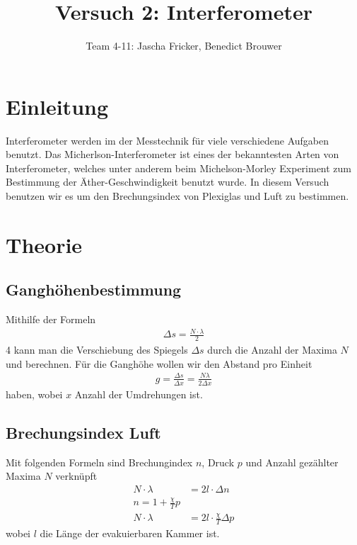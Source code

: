 \documentclass[11pt, a4paper]{article}
\title{Versuch 2: Interferometer}
\author{Team 4-11: Jascha Fricker, Benedict Brouwer}
\begin{document}
    \maketitle

    \tableofcontents

    \newpage

    \section{Einleitung}

    Interferometer werden im der Messtechnik für viele verschiedene Aufgaben benutzt. Das Micherlson-Interferometer ist eines der bekanntesten Arten von Interferometer, welches unter anderem beim Michelson-Morley Experiment zum Bestimmung der Äther-Geschwindigkeit benutzt wurde. In diesem Versuch benutzen wir es um den Brechungsindex von Plexiglas und Luft zu bestimmen.

    \section{Theorie}
    \subsection{Ganghöhenbestimmung}

    Mithilfe der Formeln
    \begin{align}
        \Delta s = \frac{N \cdot \lambda}{2}
    \end{align}4
    kann man die Verschiebung des Spiegels $\Delta s$ durch die Anzahl der Maxima $N$ und berechnen. Für die Ganghöhe wollen wir den Abstand pro Einheit
    \begin{align}
        g = \frac{\Delta s}{\Delta x} = \frac{N \lambda}{2 \Delta x}
    \end{align}
    haben, wobei $x$ Anzahl der Umdrehungen ist. 

    \subsection{Brechungsindex Luft}
    Mit folgenden Formeln sind Brechungindex $n$, Druck $p$ und Anzahl gezählter Maxima $N$ verknüpft
    \begin{align}
        N \cdot \lambda &= 2 l \cdot \Delta n \\
        n = 1 + \frac{\chi}{T} p \label{eq:luft} \\ 
        N \cdot \lambda &= 2 l \cdot \frac{\chi}{T} \Delta p
    \end{align}
    wobei $l$ die Länge der evakuierbaren Kammer ist.
\end{document}
